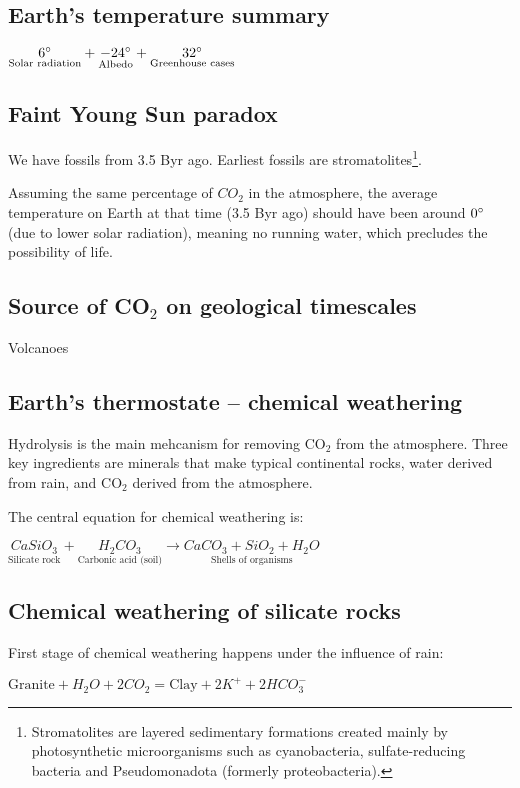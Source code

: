 \subsection{Earth's temperature summary}

$\underset{\text{Solar radiation}}{6 \degree} +
\underset{\text{Albedo}}{-24 \degree} +
\underset{\text{Greenhouse cases}}{32 \degree}$

\subsection{Faint Young Sun paradox}
We have fossils from 3.5 Byr ago. Earliest fossils are stromatolites\footnote{
Stromatolites are layered sedimentary formations created mainly by
photosynthetic microorganisms such as cyanobacteria, sulfate-reducing bacteria
and Pseudomonadota (formerly proteobacteria).
}.

Assuming the same percentage of $CO_2$ in the atmosphere, the average
temperature on Earth at that time (3.5 Byr ago) should have been around
$0 \degree$ (due to lower solar radiation), meaning no running water, which
precludes the possibility of life.

\subsection{Source of CO$_2$ on geological timescales}
Volcanoes

\subsection{Earth's thermostate -- chemical weathering}
Hydrolysis is the main mehcanism for removing CO$_2$ from the atmosphere.
Three key ingredients are minerals that make typical continental rocks, water
derived from rain, and CO$_2$ derived from the atmosphere.

The central equation for chemical weathering is:

$
\underset{\text{Silicate rock}}{CaSiO_3}
+
\underset{\text{Carbonic acid (soil)}}{H_2CO_3}
\rightarrow
\underset{\text{Shells of organisms}}{CaCO_3 + SiO_2 + H_2O}
$

\subsection{Chemical weathering of silicate rocks}
First stage of chemical weathering happens under the influence of rain:

$
\text{Granite} + H_2O + 2 CO_2 =
\text{Clay} + 2K^+ + 2 HCO_3^-
$

